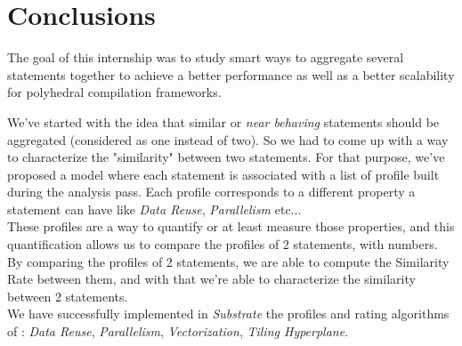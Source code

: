 \documentclass[paper=a4, fontsize=11.5pt]{scrartcl}
\numberwithin{equation}{section}        %
\numberwithin{figure}{section}          %
\numberwithin{table}{section}               %
\begin{document}

    
\section{Conclusions}
The goal of this internship was to study smart ways to aggregate several statements
together to achieve a better performance as well as a better scalability for polyhedral
compilation frameworks.

\bigskip

We've started with the idea that similar or \textit{near behaving} statements should be
aggregated (considered as one instead of two). So we had to come up with a way to characterize
the "similarity" between two statements. For that purpose, we've proposed a model where
each statement is associated with a list of profile built during the analysis pass.
Each profile corresponds to a different property a statement can have like \textit{Data Reuse},
\textit{Parallelism} etc...\\
These profiles are a way to quantify or at least measure those properties, and this quantification
allows us to compare the profiles of 2 statements, with numbers. By comparing the profiles
of 2 statements, we are able to compute the Similarity Rate between them, and with that we're
able to characterize the similarity between 2 statements.\\
We have successfully implemented in \textit{Substrate} the profiles and rating algorithms of :
\textit{Data Reuse}, \textit{Parallelism}, \textit{Vectorization}, \textit{Tiling Hyperplane}.
\end{document}
